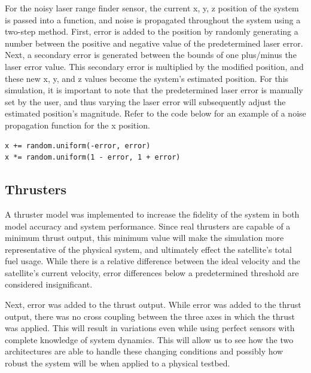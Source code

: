 \documentclass[journal, 10pt]{IEEEtran}
\begin{document}
For the noisy laser range finder sensor, the current x, y, z position of the system is passed into a function, and noise is propagated throughout the system using a two-step method. First, error is added to the position by randomly generating a number between the positive and negative value of the predetermined laser error. Next, a secondary error is generated between the bounds of one plus/minus the laser error value. This secondary error is multiplied by the modified position, and these new x, y, and z values become the system's estimated position.  For this simulation, it is important to note that the predetermined laser error is manually set by the user, and thus varying the laser error will subsequently adjust the estimated position's magnitude. Refer to the code below for an example of a noise propagation function for the x position.

\begin{verbatim}
x += random.uniform(-error, error)
x *= random.uniform(1 - error, 1 + error)
\end{verbatim}

\subsection{Thrusters}
A thruster model was implemented to increase the fidelity of the system in both model accuracy and system performance. Since real thrusters are capable of a minimum thrust output, this minimum value will make the simulation more representative of the physical system, and ultimately effect the satellite's total fuel usage. While there is a relative difference between the ideal velocity and the satellite's current velocity, error differences below a predetermined threshold are considered insignificant.

Next, error was added to the thrust output. While error was added to the thrust output, there was no cross coupling between the three axes in which the thrust was applied. This will result in variations even while using perfect sensors with complete knowledge of system dynamics.  This will allow us to see how the two architectures are able to handle these changing conditions and possibly how robust the system will be when applied to a physical testbed.
\end{document}
